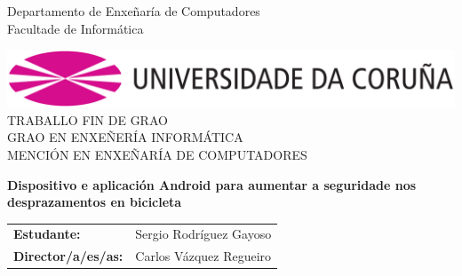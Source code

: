 \begin{titlepage}

  \hspace*{128pt}
  \textcolor{udcgray}{{\selectfont Departamento de Enxeñaría de Computadores}}\\[-2pt]
  \hspace*{145pt}
  \textcolor{udcpink}{{\selectfont Facultade de Informática}}\\[-32pt]

  \begin{center}
    \includegraphics[scale=0.3]{imaxes/udc}\\[35pt]

    {\large TRABALLO FIN DE GRAO \\
            GRAO EN ENXEÑERÍA INFORMÁTICA \\
            MENCIÓN EN ENXEÑARÍA DE COMPUTADORES } \\[100pt]

    \begin{huge}
      \bfseries Dispositivo e aplicación Android para aumentar a seguridade nos
desprazamentos en bicicleta \\[7pt]

    \end{huge}
  \end{center}

  \vfill

  \begin{flushright}
    {\large
    \begin{tabular}{ll}
      {\bf Estudante:}        & Sergio Rodríguez Gayoso \\
      {\bf Director/a/es/as:} & Carlos Vázquez Regueiro \\

    \end{tabular}}
  \end{flushright}
\end{titlepage}
